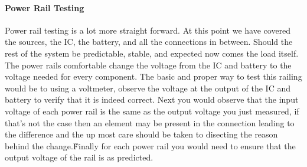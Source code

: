 \paragraph{Power Rail Testing}
Power rail testing is a lot more straight forward. At this point we have covered the sources, the IC, the battery, and all the connections in between. Should the rest of the system be predictable, stable, and expected now comes the load itself. The power rails comfortable change the voltage from the IC and battery to the voltage needed for every component. The basic and proper way to test this railing would be to using a voltmeter, observe the voltage at the output of the IC and battery to verify that it is indeed correct. Next you would observe that the input voltage of each power rail is the same as the output voltage you just measured, if that's not the case then an element may be present in the connection leading to the difference and the up most care should be taken to disecting the reason behind the change.\. Finally for each power rail you would need to ensure that the output voltage of the rail is as predicted.
